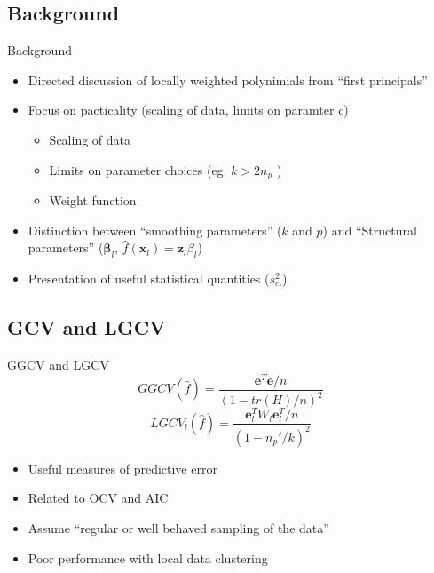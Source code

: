 \documentclass[xcolor=x11names,compress]{beamer}
\renewcommand{\(}{\begin{columns}}
\renewcommand{\)}{\end{columns}}
\newcommand{\<}[1]{\begin{column}{#1}}
\renewcommand{\>}{\end{column}}
\begin{document}
\subsection{Background}
\begin{frame}{Background}
\begin{itemize}
\item Directed discussion of locally weighted polynimials from ``first principals''
\pause
\item Focus on pacticality (scaling of data, limits on paramter c)
	\begin{itemize}
	\item Scaling of data
	\item Limits on parameter choices (eg. $k>2n_p$ )
	\item Weight function 
	\end{itemize}
\pause
\item Distinction between ``smoothing parameters'' ($k$ and $p$) and ``Structural parameters'' ($\mathbf{\beta}_l$, $\hat{f}(\mathbf{x}_l) = \mathbf{z}_l\beta_l$)
\pause
\item Presentation of useful statistical quantities ($s^2_{e_l}$)
\end{itemize}
\end{frame}

\subsection{GCV and LGCV}
\begin{frame}{GGCV and LGCV}
$$GGCV(\hat{f})=\frac{\mathbf{e}^T\mathbf{e}/n}{\left(1-tr(H)/n\right)^2}$$
$$LGCV_l(\hat{f})=\frac{\mathbf{e}^T_lW_l\mathbf{e}^T_l/n}{\left(1-n_p'/k\right)^2}$$

\begin{itemize}
	\item Useful measures of predictive error
	\item Related to OCV and AIC
	\item Assume ``regular or well behaved sampling of the data''
	\item Poor performance with local data clustering
\end{itemize}
\end{frame}

\end{document}

